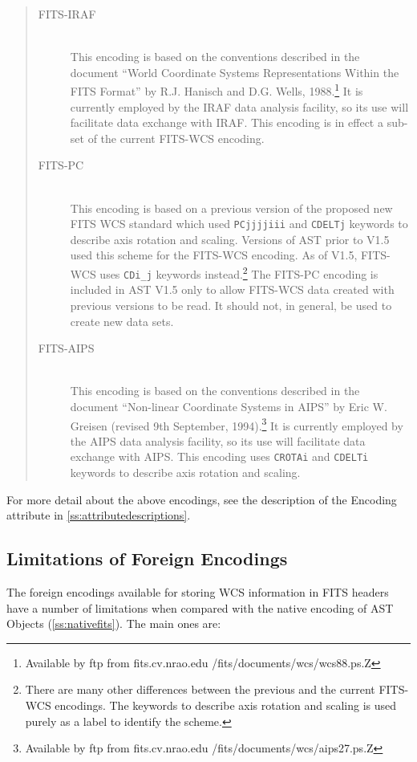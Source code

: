 \documentclass[twoside,11pt]{article}
\newcommand{\appref}[1]{Appendix~\ref{#1}}
\newcommand{\secref}[1]{\S\ref{#1}}
\renewcommand{\appref}[1]{\ref{#1}}
\renewcommand{\secref}[1]{\ref{#1}}
\begin{document}
\begin{quote}
\begin{description}
\item[FITS-IRAF]\mbox{}\\
This encoding is based on the conventions described in the document
``World Coordinate Systems Representations Within the FITS Format'' by R.J.
Hanisch and D.G. Wells, 1988.\footnote{Available by ftp from
fits.cv.nrao.edu /fits/documents/wcs/wcs88.ps.Z} It is currently employed
by the IRAF data analysis facility, so its use will facilitate data
exchange with IRAF. This encoding is in effect a sub-set of the current
FITS-WCS encoding.

\item[FITS-PC]\mbox{}\\
This encoding is based on a previous version of the proposed new FITS WCS
standard which used {\tt PCjjjjiii} and {\tt CDELTj} keywords to describe
axis rotation and scaling. Versions of AST prior to V1.5 used this scheme
for the FITS-WCS encoding. As of V1.5, FITS-WCS uses {\tt CDi\_j}
keywords instead.\footnote{There are many other differences between the
previous and the current FITS-WCS encodings. The keywords to describe
axis rotation and scaling is used purely as a label to identify the
scheme.} The FITS-PC encoding is included in AST V1.5 only to allow
FITS-WCS data created with previous versions to be read. It should not,
in general, be used to create new data sets.

\item[FITS-AIPS]\mbox{}\\
This encoding is based on the conventions described in the document
``Non-linear Coordinate Systems in AIPS'' by Eric W. Greisen (revised 9th
September, 1994).\footnote{Available by ftp from fits.cv.nrao.edu
/fits/documents/wcs/aips27.ps.Z} It is currently employed by the AIPS
data analysis facility, so its use will facilitate data exchange with
AIPS. This encoding uses {\tt CROTAi} and {\tt CDELTi} keywords to
describe axis rotation and scaling.
\end{description}
\end{quote}

For more detail about the above encodings, see the description of the
Encoding attribute in \appref{ss:attributedescriptions}. 

\subsection{\label{ss:foreignfitslimitations}Limitations of Foreign Encodings}

The foreign encodings available for storing WCS information in FITS
headers have a number of limitations when compared with the native
encoding of AST Objects (\secref{ss:nativefits}). The main ones are:
\end{document}
